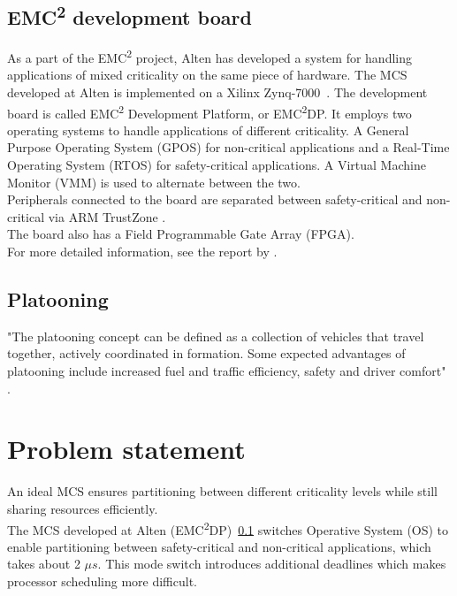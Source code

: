 \subsection{EMC\textsuperscript{2} development board}
\label{sec:mces}
As a part of the EMC\textsuperscript{2} project, Alten has developed a system for handling applications of mixed criticality on the same piece of hardware. The MCS developed at Alten is implemented on a Xilinx Zynq-7000~\cite{website:xilinx}. The development board is called EMC\textsuperscript{2} Development Platform, or EMC\textsuperscript{2}DP. It employs two operating systems to handle applications of different criticality. A General Purpose Operating System (GPOS) for non-critical applications and a Real-Time Operating System (RTOS) for safety-critical applications. A Virtual Machine Monitor (VMM) is used to alternate between the two. \\ %

Peripherals connected to the board are separated between safety-critical and non-critical via ARM TrustZone \cite{website:ARM}. \\

The board also has a Field Programmable Gate Array (FPGA). \\


For more detailed information, see the report by \cite{zaki2016}.

\subsection{Platooning}
\label{sec:platooning}
"The platooning concept can be defined as a collection of  vehicles that travel together, actively coordinated in formation. Some expected advantages of platooning include increased fuel and traffic efficiency, safety and driver comfort" \cite{bergenhem}.

\section{Problem statement}
\label{sec:problem}
An ideal MCS ensures partitioning between different criticality levels while still sharing resources efficiently.\\ %

The MCS developed at Alten (EMC\textsuperscript{2}DP)~\ref{sec:mces} switches Operative System (OS) to enable partitioning between safety-critical and non-critical applications, which takes about 2 $\mu s$. This mode switch introduces additional deadlines which makes processor scheduling more difficult.\\ %

